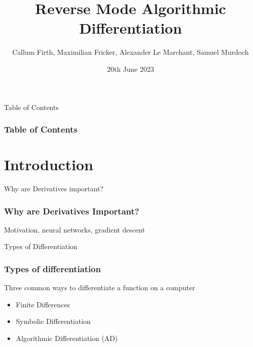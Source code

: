 \documentclass{beamer}
\title{Reverse Mode Algorithmic Differentiation}
\author[Group 18]{Callum Firth, Maximilian Fricker, Alexander Le Marchant, Samuel Murdoch}
\institute[Imperial]{Imperial College London}
\date{20th June 2023}
\begin{document}
\frame{\titlepage}



% 




\begin{frame}{Table of Contents}
    \frametitle{Table of Contents}
    \tableofcontents
\end{frame}

\section{Introduction}

\begin{frame}{Why are Derivatives important?}
\frametitle{Why are Derivatives Important?}
Motivation, neural networks, gradient descent
\end{frame}

\begin{frame}{Types of Differentiation}
\frametitle{Types of differentiation}
Three common ways to differentiate a function on a computer
\begin{itemize}
    \item Finite Differences
    \item Symbolic Differentiation
    \item Algorithmic Differentiation (AD)
\end{itemize}
\end{frame}
\end{document}
